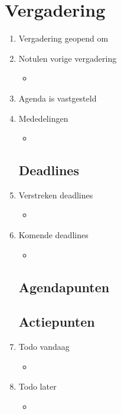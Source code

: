 \documentclass{article}
\begin{document}
\section*{Vergadering}
\begin{enumerate}
	
	\subsection*{Vooraf}
	\item Vergadering geopend om %
	\item Notulen vorige vergadering
	\begin{itemize}
		\item
	\end{itemize}
	\item Agenda is vastgesteld
	\item Mededelingen
	\begin{itemize}
		\item
	\end{itemize}

	\subsection*{Deadlines}
	\item Verstreken deadlines
	\begin{itemize}
		\item
	\end{itemize}
	\item Komende deadlines
	\begin{itemize}
		\item
	\end{itemize}

	\subsection*{Agendapunten}
	

	\subsection*{Actiepunten}
	\item Todo vandaag
	\begin{itemize}
		\item
	\end{itemize}
	\item Todo later
	\begin{itemize}
		\item
	\end{itemize}


\end{enumerate}
\end{document}
